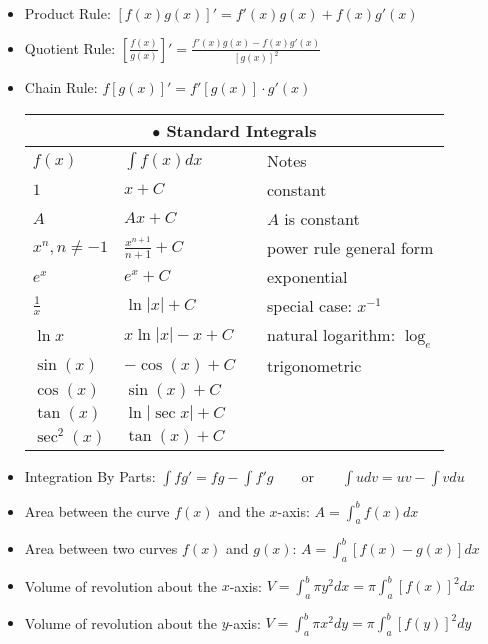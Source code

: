 \begin{itemize}
	\item Product Rule: $[f(x)g(x)]' = f'(x)g(x) + f(x)g'(x)$
	\item Quotient Rule: $\displaystyle \left[\frac{f(x)}{g(x)}\right]' = \frac{f'(x)g(x) - f(x)g'(x)}{[g(x)]^2}$
	\item Chain Rule: $f[g(x)]' = f'[g(x)] \cdot g'(x)$
\clearpage
\thispagestyle{empty}
		\renewcommand{\arraystretch}{1.2}
		\begin{tabular}{llcl}
			\multicolumn{4}{c}{$\bullet$ Standard Integrals}\\\midrule
			$f(x)$  &  $\int f(x)dx$&&Notes \\ \midrule
			$1$&$x+C$&&constant\\
			$A$&$Ax+C$&&$A$ is constant\\\midrule
			$x^n, n \neq -1$ & $\displaystyle\frac{x^{n+1}}{n+1}+C$&&power rule general form\\
			$e^x$ & $e^x+C$&&exponential\\
			$\frac{1}{x}$ & $\ln|x|+C$&&special case: $x^{-1}$\\
			$\ln x$&$x\ln |x|-x+C$&&natural logarithm: $\log_e$\\\midrule
			$\sin(x)$ & $-\cos(x)+C$&& trigonometric \\
			$\cos(x)$ & $\sin(x)+C$\\
			$\tan (x)$&$\ln |\sec x|+C$\\
			$\sec^2(x)$ & $\tan(x)+C$ \\ \bottomrule
		\end{tabular}
	\item Integration By Parts: $\displaystyle \int fg' = fg-\int f'g \qquad \text{or} \qquad \int udv = uv - \int vdu$
	\item Area between the curve $f(x)$ and the $x$-axis: $\displaystyle A=\int_{a}^{b} f(x)dx$\\
	\item Area between two curves $f(x)$ and $g(x)$: $\displaystyle A=\int_{a}^{b} \left[f(x)-g(x)\right]dx$\\
	\item Volume of revolution about the $x$-axis:
	$\displaystyle V= \int_{a}^{b} \pi y^2 dx = \pi\int_{a}^{b}  [f(x)]^2 dx$
	\item Volume of revolution about the $y$-axis:
	$\displaystyle V= \int_{a}^{b} \pi x^2 dy = \pi\int_{a}^{b}  [f(y)]^2 dy$
\end{itemize}

